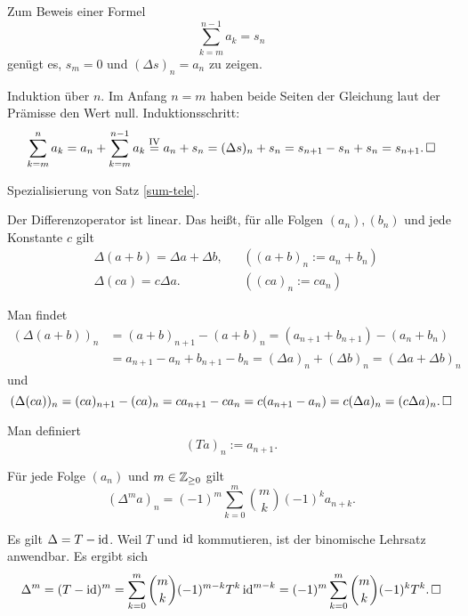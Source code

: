 \begin{Satz}
Zum Beweis einer Formel
\[\sum_{k=m}^{n-1} a_k = s_n\]
genügt es, $s_m=0$ und $(\Delta s)_n = a_n$ zu zeigen.
\end{Satz}
\begin{Beweis}[Beweis 1]
Induktion über $n$. Im Anfang $n=m$ haben beide Seiten der Gleichung laut
der Prämisse den Wert null. Induktionsschritt:
\[\sum_{k=m}^n a_k = a_n + \sum_{k=m}^{n-1} a_k
\stackrel{\mathrm{IV}}= a_n + s_n
= (\Delta s)_n + s_n = s_{n+1} - s_n + s_n = s_{n+1}.\,\square\]
\end{Beweis}
\begin{Beweis}[Beweis 2]
Spezialisierung von Satz \ref{sum-tele}.\,\qedsymbol
\end{Beweis}

\begin{Satz} Der Differenzoperator ist linear. Das heißt,
für alle Folgen $(a_n), (b_n)$ und jede Konstante $c$ gilt
\begin{align*}
& \Delta(a+b) = \Delta a + \Delta b, && ((a+b)_n := a_n + b_n)\\
& \Delta(ca) = c\Delta a. && ((ca)_n := ca_n)
\end{align*}
\end{Satz}
\begin{Beweis} Man findet
\begin{align*}
(\Delta(a+b))_n &= (a+b)_{n+1} - (a+b)_n
= (a_{n+1}+b_{n+1}) - (a_n+b_n)\\
&= a_{n+1}-a_n + b_{n+1}-b_n = (\Delta a)_n + (\Delta b)_n
= (\Delta a + \Delta b)_n
\end{align*}
und
\[(\Delta(ca))_n = (ca)_{n+1} - (ca)_n = ca_{n+1} - ca_n
= c(a_{n+1} - a_n) = c(\Delta a)_n = (c\Delta a)_n.\,\square\]
\end{Beweis}

\begin{Definition}[Shiftoperator] Man definiert
\[(Ta)_n := a_{n+1}.\]
\end{Definition}

\begin{Satz}\newlinefirst
Für jede Folge $(a_n)$ und $m\in\mathbb Z_{\ge 0}$ gilt
\[(\Delta^m a)_n = (-1)^m\sum_{k=0}^m\binom{m}{k} (-1)^k a_{n+k}.\]
\end{Satz}
\begin{Beweis} Es gilt $\Delta = T-\operatorname{id}$. Weil $T$ und $\operatorname{id}$ kommutieren,
ist der binomische Lehrsatz anwendbar. Es ergibt sich
\[\Delta^m = (T-\operatorname{id})^m = \sum_{k=0}^m\binom{m}{k} (-1)^{m-k} T^k\operatorname{id}^{m-k}
= (-1)^m \sum_{k=0}^m\binom{m}{k} (-1)^k T^k.\,\square\]
\end{Beweis}

